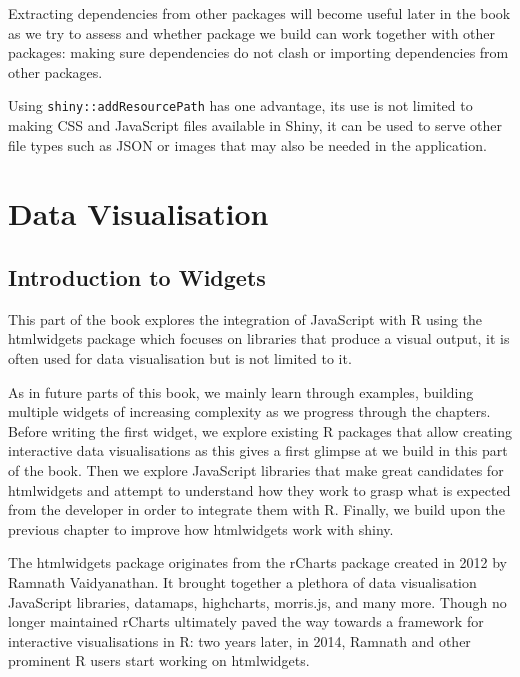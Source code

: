 \documentclass[
]{krantz}
\begin{document}
Extracting dependencies from other packages will become useful later in the book as we try to assess and whether package we build can work together with other packages: making sure dependencies do not clash or importing dependencies from other packages.

Using \texttt{shiny::addResourcePath} has one advantage, its use is not limited to making CSS and JavaScript files available in Shiny, it can be used to serve other file types such as JSON or images that may also be needed in the application.

\hypertarget{part-data-visualisation}{%
\part{Data Visualisation}\label{part-data-visualisation}}

\hypertarget{widgets-intro-intro}{%
\chapter{Introduction to Widgets}\label{widgets-intro-intro}}

This part of the book explores the integration of JavaScript with R using the htmlwidgets package which focuses on libraries that produce a visual output, it is often used for data visualisation but is not limited to it.

As in future parts of this book, we mainly learn through examples, building multiple widgets of increasing complexity as we progress through the chapters. Before writing the first widget, we explore existing R packages that allow creating interactive data visualisations as this gives a first glimpse at we build in this part of the book. Then we explore JavaScript libraries that make great candidates for htmlwidgets and attempt to understand how they work to grasp what is expected from the developer in order to integrate them with R. Finally, we build upon the previous chapter to improve how htmlwidgets work with shiny.

The htmlwidgets package originates from the rCharts \citep{R-rCharts} package created in 2012 by Ramnath Vaidyanathan. It brought together a plethora of data visualisation JavaScript libraries, datamaps, highcharts, morris.js, and many more. Though no longer maintained rCharts ultimately paved the way towards a framework for interactive visualisations in R: two years later, in 2014, Ramnath and other prominent R users start working on htmlwidgets.
\end{document}
